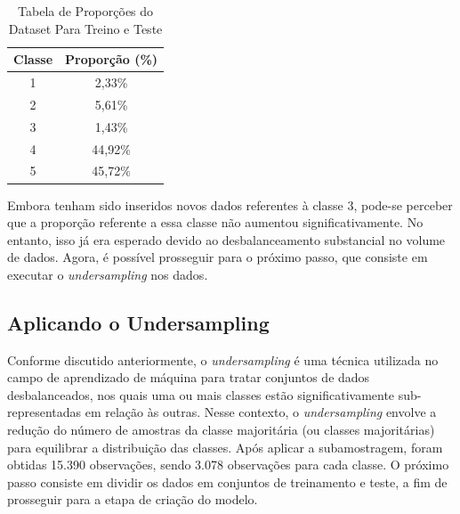 \documentclass[12pt,oneside,a4paper,chapter=TITLE,
			   english,brazil]{abntex2}
\begin{document}
\begin{table}[htbp]
    \centering
  \caption[Tabela de Proporções do Dataset Para Treino e Teste]{Tabela de Proporções do Dataset Para Treino e Teste}
    \begin{tabular}{cc}
        \toprule
        \textbf{Classe} & \textbf{Proporção (\%)} \\
        \midrule
        1 & 2,33\% \\
        2 & 5,61\% \\
        3 & 1,43\% \\
        4 & 44,92\% \\
        5 & 45,72\% \\
        \bottomrule
    \end{tabular}
    \label{tab:proporcoes}
    \end{table}
 \begin{flushleft}
\vspace{-2.2em}
\centering
{}
\end{flushleft}

Embora tenham sido inseridos novos dados referentes à classe 3, pode-se perceber que a proporção referente a essa classe não aumentou significativamente. No entanto, isso já era esperado devido ao desbalanceamento substancial no volume de dados. Agora, é possível prosseguir para o próximo passo, que consiste em executar o \textit{undersampling} nos dados.

\vspace{\onelineskip}
\subsection{Aplicando o Undersampling}
\vspace{\onelineskip}

Conforme discutido anteriormente, o \textit{undersampling} é uma técnica utilizada no campo de aprendizado de máquina para tratar conjuntos de dados desbalanceados, nos quais uma ou mais classes estão significativamente sub-representadas em relação às outras. Nesse contexto, o \textit{undersampling} envolve a redução do número de amostras da classe majoritária (ou classes majoritárias) para equilibrar a distribuição das classes. Após aplicar a subamostragem, foram obtidas 15.390 observações, sendo 3.078 observações para cada classe. O próximo passo consiste em dividir os dados em conjuntos de treinamento e teste, a fim de prosseguir para a etapa de criação do modelo. %
\end{document}
